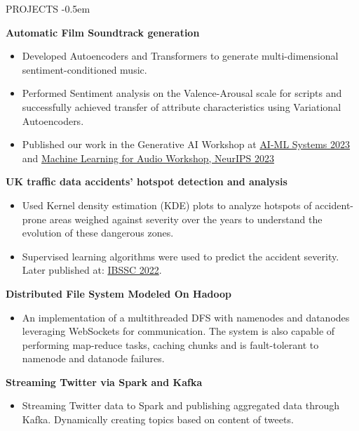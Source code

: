 \documentclass{resume} %
\begin{document}

\begin{rSection}{PROJECTS}
\vspace{-1em}
 \itemsep-0.5em
\item \textbf{Automatic Film Soundtrack generation} \vspace{-5pt}
\begin{itemize}
 \itemsep-0.7em
    \item Developed Autoencoders and Transformers to generate multi-dimensional sentiment-conditioned music. 
    \item Performed Sentiment analysis on the Valence-Arousal scale for scripts and successfully achieved transfer of attribute characteristics using Variational Autoencoders. 
    \item Published our work in the Generative AI Workshop at  \href{https://dl.acm.org/doi/10.1145/3639856.3639891}{AI-ML Systems 2023} and \href{https://arxiv.org/abs/2401.07084}{Machine Learning for Audio Workshop, NeurIPS 
2023}
\end{itemize}

\item \textbf{UK traffic data accidents' hotspot detection and analysis} \vspace{-5pt}
\begin{itemize}
 \itemsep-0.7em
 \item Used Kernel density estimation (KDE) plots to analyze hotspots of accident-prone areas weighed against severity over the years to understand the evolution of these dangerous zones. 
 \item Supervised learning algorithms were used to predict the accident severity. Later published at: \href{https://ieeexplore.ieee.org/document/10037449}{IBSSC 2022}.
 \end{itemize}
\item \textbf{Distributed File System Modeled On Hadoop}\vspace{-5pt} 
\begin{itemize}
 \itemsep-0.7em
 \item An implementation of a multithreaded DFS with namenodes and datanodes leveraging WebSockets for communication. The system is also capable of performing map-reduce tasks, caching chunks and is fault-tolerant to namenode and datanode failures.
   \end{itemize}

\item \textbf{Streaming Twitter via Spark and Kafka} \vspace{-5pt} 
\begin{itemize}
 \itemsep-0.7em
 \item Streaming Twitter data to Spark and publishing aggregated data through Kafka. Dynamically creating topics based on content of tweets.
  \end{itemize}

\end{rSection} 

\end{document}
